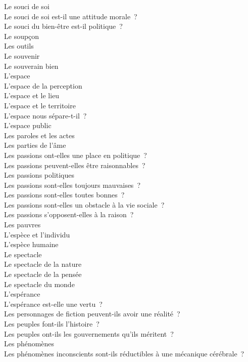 \documentclass[a4paper,12pt]{article}
\begin{document}
Le souci de soi \\
Le souci de soi est-il une attitude morale ? \\
Le souci du bien-être est-il politique ? \\
Le soupçon \\
Les outils \\
Le souvenir \\
Le souverain bien \\
L'espace \\
L'espace de la perception \\
L'espace et le lieu \\
L'espace et le territoire \\
L'espace nous sépare-t-il ? \\
L'espace public \\
Les paroles et les actes \\
Les parties de l'âme \\
Les passions ont-elles une place en politique ? \\
Les passions peuvent-elles être raisonnables ? \\
Les passions politiques \\
Les passions sont-elles toujours mauvaises ? \\
Les passions sont-elles toutes bonnes ? \\
Les passions sont-elles un obstacle à la vie sociale ? \\
Les passions s'opposent-elles à la raison ? \\
Les pauvres \\
L'espèce et l'individu \\
L'espèce humaine \\
Le spectacle \\
Le spectacle de la nature \\
Le spectacle de la pensée \\
Le spectacle du monde \\
L'espérance \\
L'espérance est-elle une vertu ? \\
Les personnages de fiction peuvent-ils avoir une réalité ? \\
Les peuples font-ils l'histoire ? \\
Les peuples ont-ils les gouvernements qu'ils méritent ? \\
Les phénomènes \\
Les phénomènes inconscients sont-ils réductibles à une mécanique cérébrale ? \\
\end{document}
